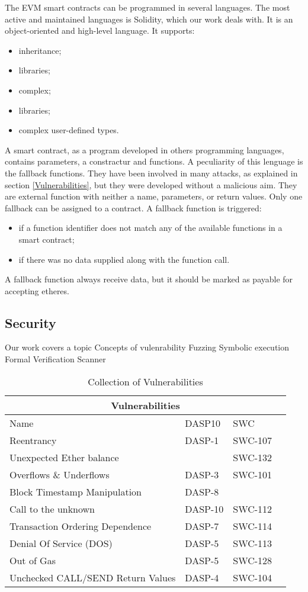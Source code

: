 \documentclass[a4paper,sigconf, language=french,
language=german, language=spanish, language=english]{acmart}
\begin{document}
The EVM smart contracts can be programmed in several languages. The most active and maintained languages is Solidity, which our work deals with. 
It is an object-oriented and high-level language. It supports:
\begin{itemize}
  \item inheritance;
  \item libraries;
  \item complex;
  \item libraries;
  \item complex user-defined types.
\end{itemize}
A smart contract, as a program developed in others programming languages, contains parameters, a constractur and functions. A peculiarity of this lenguage is the fallback functions. 
They have been involved in many attacks, as explained in section \ref{Vulnerabilities}, but they were developed without a malicious aim. 
They are external function with neither a name, parameters, or return values. Only one fallback can be assigned to a contract. 
A fallback function is triggered:
\begin{itemize}
  \item if a function identifier does not match any of the available functions in a smart contract;
  \item if there was no data supplied along with the function call.
\end{itemize}

A fallback function always receive data, but it should be marked as payable for accepting etheres. 


\subsection{Security}
Our work covers a topic 
Concepts of vulenrability
Fuzzing
Symbolic execution 
Formal Verification 
Scanner 


\begin{table*}
  \caption{Collection of Vulnerabilities}
  \begin{tabular}{ |p{5cm}||p{5cm}|p{3cm}| p{3cm} | }
  \hline
  \multicolumn{4}{|c|}{Vulnerabilities} \\
  \hline
  Name  & DASP10 & SWC \\
  \hline
  Reentrancy  & DASP-1 & SWC-107 \\
  \hline
  Unexpected Ether balance  & & SWC-132  \\
  \hline
  Overflows \& Underflows  & DASP-3 & SWC-101 \\
  \hline
  Block Timestamp Manipulation  & DASP-8 & \\
  \hline
  Call to the unknown  & DASP-10 & SWC-112 \\
  \hline
  Transaction Ordering Dependence  & DASP-7  & SWC-114 \\
  \hline
  Denial Of Service (DOS)  & DASP-5 &  SWC-113\\
  \hline
  Out of Gas  & DASP-5 & SWC-128 \\
  \hline
  Unchecked CALL/SEND Return Values  & DASP-4 & SWC-104\\
  \hline
  \end{tabular}
\end{table*}
\end{document}
